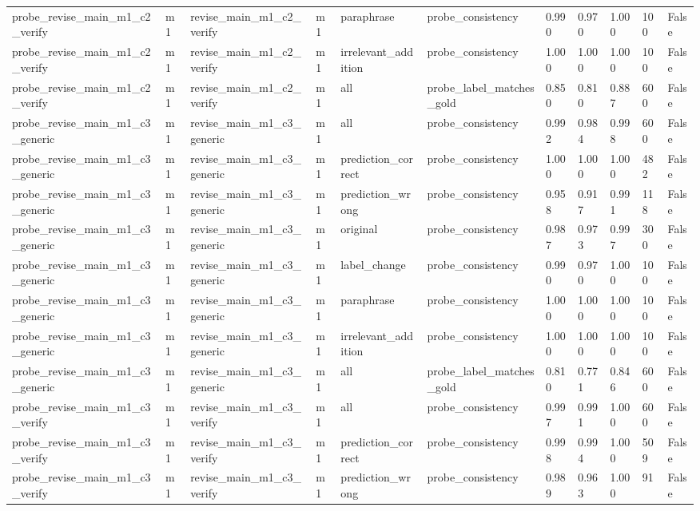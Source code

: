 \begin{tabular}{lllllllllll}
probe\_revise\_main\_m1\_c2\_verify & m1 & revise\_main\_m1\_c2\_verify & m1 & paraphrase & probe\_consistency & 0.990 & 0.970 & 1.000 & 100 & False \\
probe\_revise\_main\_m1\_c2\_verify & m1 & revise\_main\_m1\_c2\_verify & m1 & irrelevant\_addition & probe\_consistency & 1.000 & 1.000 & 1.000 & 100 & False \\
probe\_revise\_main\_m1\_c2\_verify & m1 & revise\_main\_m1\_c2\_verify & m1 & all & probe\_label\_matches\_gold & 0.850 & 0.810 & 0.887 & 600 & False \\
probe\_revise\_main\_m1\_c3\_generic & m1 & revise\_main\_m1\_c3\_generic & m1 & all & probe\_consistency & 0.992 & 0.984 & 0.998 & 600 & False \\
probe\_revise\_main\_m1\_c3\_generic & m1 & revise\_main\_m1\_c3\_generic & m1 & prediction\_correct & probe\_consistency & 1.000 & 1.000 & 1.000 & 482 & False \\
probe\_revise\_main\_m1\_c3\_generic & m1 & revise\_main\_m1\_c3\_generic & m1 & prediction\_wrong & probe\_consistency & 0.958 & 0.917 & 0.991 & 118 & False \\
probe\_revise\_main\_m1\_c3\_generic & m1 & revise\_main\_m1\_c3\_generic & m1 & original & probe\_consistency & 0.987 & 0.973 & 0.997 & 300 & False \\
probe\_revise\_main\_m1\_c3\_generic & m1 & revise\_main\_m1\_c3\_generic & m1 & label\_change & probe\_consistency & 0.990 & 0.970 & 1.000 & 100 & False \\
probe\_revise\_main\_m1\_c3\_generic & m1 & revise\_main\_m1\_c3\_generic & m1 & paraphrase & probe\_consistency & 1.000 & 1.000 & 1.000 & 100 & False \\
probe\_revise\_main\_m1\_c3\_generic & m1 & revise\_main\_m1\_c3\_generic & m1 & irrelevant\_addition & probe\_consistency & 1.000 & 1.000 & 1.000 & 100 & False \\
probe\_revise\_main\_m1\_c3\_generic & m1 & revise\_main\_m1\_c3\_generic & m1 & all & probe\_label\_matches\_gold & 0.810 & 0.771 & 0.846 & 600 & False \\
probe\_revise\_main\_m1\_c3\_verify & m1 & revise\_main\_m1\_c3\_verify & m1 & all & probe\_consistency & 0.997 & 0.991 & 1.000 & 600 & False \\
probe\_revise\_main\_m1\_c3\_verify & m1 & revise\_main\_m1\_c3\_verify & m1 & prediction\_correct & probe\_consistency & 0.998 & 0.994 & 1.000 & 509 & False \\
probe\_revise\_main\_m1\_c3\_verify & m1 & revise\_main\_m1\_c3\_verify & m1 & prediction\_wrong & probe\_consistency & 0.989 & 0.963 & 1.000 & 91 & False \\

\end{tabular}
